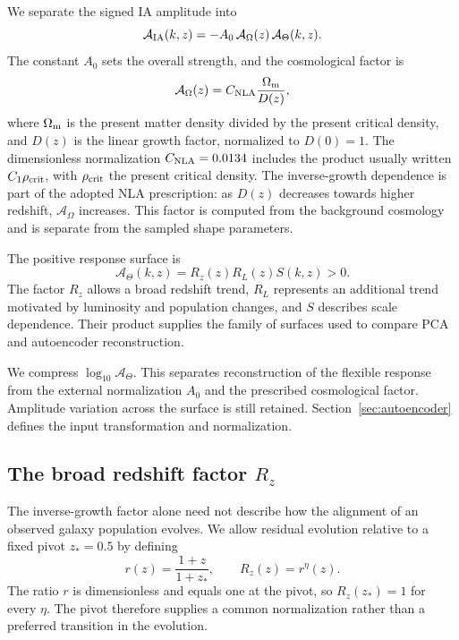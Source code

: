 We separate the signed IA amplitude into
\begin{equation}
  \mathcal A_{\rm IA}(k,z)
  = -A_0\,\mathcal A_\Omega(z)\,\mathcal A_\Theta(k,z).
  \label{eq:ia_decomposition}
\end{equation}
The constant $A_0$ sets the overall strength, and the cosmological factor is
\begin{equation}
  \mathcal A_\Omega(z)=C_{\rm NLA}\frac{\Omega_{\rm m}}{D(z)},
  \label{eq:a-omega}
\end{equation}
where $\Omega_{\rm m}$ is the present matter density divided by the present
critical density, and $D(z)$ is the linear growth factor, normalized to
$D(0)=1$.
The dimensionless normalization $C_{\rm NLA}=0.0134$ includes the product
usually written $C_1\rho_{\rm crit}$, with $\rho_{\rm crit}$ the present
critical density. The inverse-growth dependence is part of the adopted
NLA prescription: as $D(z)$ decreases towards higher redshift,
$\mathcal A_\Omega$ increases. This factor is computed from the background
cosmology and is separate from the sampled shape parameters.

The positive response surface is
\begin{equation}
  \mathcal A_\Theta(k,z)=R_z(z)R_L(z)S(k,z)>0.
  \label{eq:shape_surface}
\end{equation}
The factor $R_z$ allows a broad redshift trend, $R_L$ represents an
additional trend motivated by luminosity and population changes, and $S$
describes scale dependence. Their product supplies the family of surfaces
used to compare PCA and autoencoder reconstruction.

We compress $\log_{10}\mathcal A_\Theta$. This separates reconstruction of
the flexible response from the external normalization $A_0$ and the
prescribed cosmological factor. Amplitude variation across the surface is
still retained. Section~\ref{sec:autoencoder} defines the input
transformation and normalization.

\subsection{The broad redshift factor \texorpdfstring{$R_z$}{Rz}}
\label{sec:redshift-factor}

The inverse-growth factor alone need not describe how the alignment of an
observed galaxy population evolves. We allow residual evolution relative
to a fixed pivot $z_*=0.5$ by defining
\begin{equation}
  r(z)=\frac{1+z}{1+z_*},
  \qquad R_z(z)=r^\eta(z).
  \label{eq:broad-redshift-factor}
\end{equation}
The ratio $r$ is dimensionless and equals one at the pivot, so
$R_z(z_*)=1$ for every $\eta$. The pivot therefore supplies a common
normalization rather than a preferred transition in the evolution.

